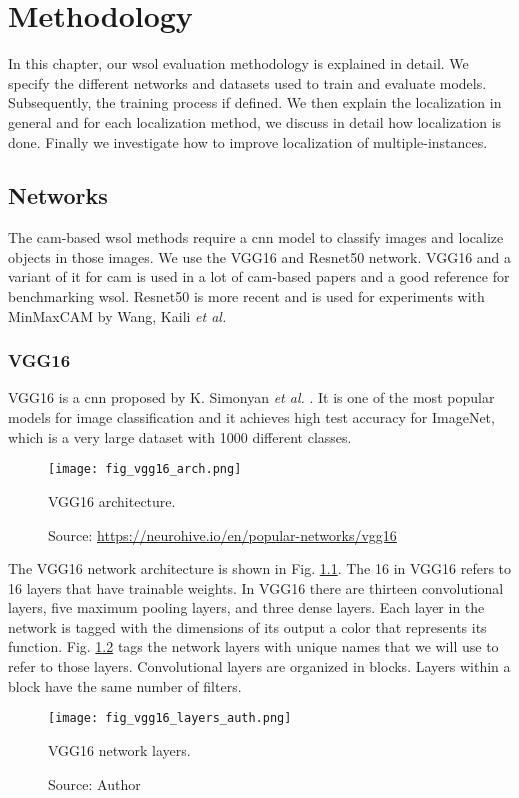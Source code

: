 \chapter{Methodology} \label{ch:methodology}

In this chapter, our \acrshort{wsol} evaluation methodology is explained in detail. We specify the different networks and datasets used to train and evaluate models. Subsequently, the training process if defined. We then explain the localization in general and for each localization method, we discuss in detail how localization is done. Finally we  investigate how to improve localization of multiple-instances.

\section{Networks}
The \acrshort{cam}-based \acrshort{wsol} methods require a \acrshort{cnn} model to classify images and localize objects in those images. We use the VGG16 and Resnet50 network. VGG16 and a variant of it for \acrshort{cam} is used in a lot of \acrshort{cam}-based papers and a good reference for benchmarking \acrshort{wsol}. Resnet50 is more recent and is used for experiments with MinMaxCAM by Wang, Kaili \textit{et al.}

\subsection{VGG16}
VGG16 is a \acrshort{cnn} proposed by K. Simonyan \textit{et al.} \cite{simonyan2014very}. It is one of the most popular models for image classification and it achieves high test accuracy for ImageNet, which is a very large dataset with 1000 different classes.
\begin{figure}[ht]
    \begin{center}       
    \texttt{[image: fig\_vgg16\_arch.png]}
    \caption[VGG16 architecture]{VGG16 architecture.}
    \caption*{Source: \href{https://neurohive.io/en/popular-networks/vgg16}{https://neurohive.io/en/popular-networks/vgg16}}
    \label{fig:vgg16_arch}
    \end{center}
\end{figure}

The VGG16 network architecture is shown in Fig. \ref{fig:vgg16_arch}. The 16 in VGG16 refers to 16 layers that have trainable weights. In VGG16 there are thirteen convolutional layers, five maximum pooling layers, and three dense layers. Each layer in the network is tagged with the dimensions of its output a color that represents its function. Fig. \ref{fig:vgg16_layers_auth} tags the network layers with unique names that we will use to refer to those layers. Convolutional layers are organized in blocks. Layers within a block have the same number of filters.
\begin{figure}[ht]
    \begin{center}       
    \texttt{[image: fig\_vgg16\_layers\_auth.png]}
    \caption[VGG16 network layers]{VGG16 network layers.}
    \caption*{Source: Author}
    \label{fig:vgg16_layers_auth}
    \end{center}
\end{figure}

